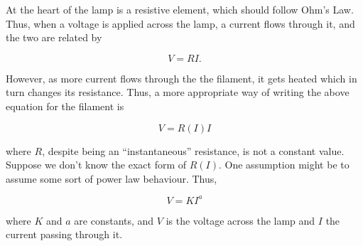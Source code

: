 At the heart of the lamp is a resistive element, which should follow Ohm's Law. Thus, when a voltage is applied across the lamp, a current flows through it, and the two are related by 

\begin{equation}
    V = R I.
    \label{ohm}
\end{equation}

However, as more current flows through the the filament, it gets heated which in turn changes its resistance. Thus, a more appropriate way of writing the above equation for the filament is 

\begin{equation}
    V = R(I) I
\end{equation}

where $R$, despite being an ``instantaneous'' resistance, is not a constant value. Suppose we don't know the exact form of $R(I)$. One assumption might be to assume some sort of power law behaviour. Thus,

\begin{equation}
    V = K I^a
    \label{isl-Vpowerlaw}
\end{equation}

where $K$ and $a$ are constants, and $V$ is the voltage across the lamp and $I$ the current passing through it.






